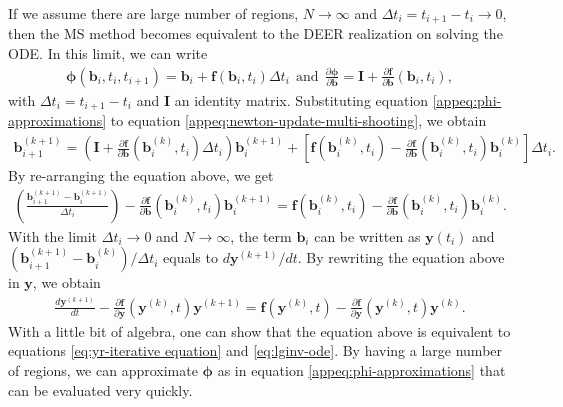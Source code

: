 If we assume there are large number of regions, $N \rightarrow \infty$ and $\Delta t_i = t_{i+1} - t_i \rightarrow 0$, then the MS method becomes equivalent to the DEER realization on solving the ODE.
In this limit, we can write
\begin{align}
\label{appeq:phi-approximations}
    \boldsymbol\phi(\mathbf{b}_i, t_i, t_{i+1}) = \mathbf{b}_i + \mathbf{f}(\mathbf{b}_i, t_i) \Delta t_i\ \ \mathrm{and}\ \ \frac{\partial \boldsymbol{\phi}}{\partial \mathbf{b}} = \mathbf{I} + \frac{\partial \mathbf{f}}{\partial \mathbf{b}}(\mathbf{b}_i, t_i),
\end{align}
with $\Delta t_i = t_{i+1} - t_i$ and $\mathbf{I}$ an identity matrix.
Substituting equation \ref{appeq:phi-approximations} to equation \ref{appeq:newton-update-multi-shooting}, we obtain
\begin{align}
\label{appeq:newton-update-multi-shooting-linear}
    \mathbf{b}_{i+1}^{(k+1)} = \left(\mathbf{I} + \frac{\partial \mathbf{f}}{\partial\mathbf{b}}(\mathbf{b}_i^{(k)}, t_i) \Delta t_i\right)\mathbf{b}_i^{(k+1)} + \left[\mathbf{f}(\mathbf{b}_i^{(k)}, t_i) - \frac{\partial \mathbf{f}}{\partial \mathbf{b}}(\mathbf{b}_i^{(k)}, t_i) \mathbf{b}_i^{(k)} \right] \Delta t_i.
\end{align}
By re-arranging the equation above, we get
\begin{align}
    \left(\frac{\mathbf{b}_{i+1}^{(k+1)} - \mathbf{b}_i^{(k+1)}}{\Delta t_i}\right) - \frac{\partial \mathbf{f}}{\partial\mathbf{b}}(\mathbf{b}_i^{(k)}, t_i) \mathbf{b}_i^{(k+1)} = \mathbf{f}(\mathbf{b}_i^{(k)}, t_i) - \frac{\partial \mathbf{f}}{\partial \mathbf{b}}(\mathbf{b}_i^{(k)}, t_i) \mathbf{b}_i^{(k)}.
\end{align}
With the limit $\Delta t_i \rightarrow 0$ and $N \rightarrow \infty$, the term $\mathbf{b}_i$ can be written as $\mathbf{y}(t_i)$ and $(\mathbf{b}_{i+1}^{(k+1)} - \mathbf{b}_i^{(k)}) / \Delta t_i$ equals to $d\mathbf{y}^{(k+1)} / dt$.
By rewriting the equation above in $\mathbf{y}$, we obtain
\begin{align}
    \frac{d\mathbf{y}^{(k+1)}}{dt} - \frac{\partial \mathbf{f}}{\partial \mathbf{y}}(\mathbf{y}^{(k)}, t) \mathbf{y}^{(k+1)} = \mathbf{f}(\mathbf{y}^{(k)}, t) - \frac{\partial \mathbf{f}}{\partial \mathbf{y}}(\mathbf{y}^{(k)}, t) \mathbf{y}^{(k)}.
\end{align}
With a little bit of algebra, one can show that the equation above is equivalent to equations \ref{eq:yr-iterative equation} and \ref{eq:lginv-ode}.
By having a large number of regions, we can approximate $\boldsymbol\phi$ as in equation \ref{appeq:phi-approximations} that can be evaluated very quickly.

